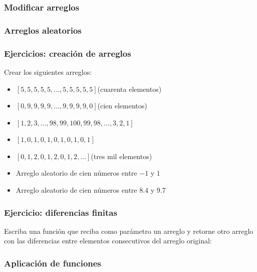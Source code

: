 \documentclass[12pt]{beamer}
\begin{document}
  \begin{frame}
    \label{modificar-arreglos}
    \frametitle{Modificar arreglos}
    \footnotesize
    
  \end{frame}

  \begin{frame}
    \label{arreglos-aleatorios}
    \frametitle{Arreglos aleatorios}
    \footnotesize
    
  \end{frame}

  \begin{frame}
    \label{ejercicio-crear-arreglos}
    \frametitle{Ejercicios: creación de arreglos}
    Crear los siguientes arreglos:
    \begin{itemize}
      \item \([5, 5, 5, 5, 5, \ldots, 5, 5, 5, 5, 5]\)\quad(cuarenta elementos)
      \item \([0, 9, 9, 9, 9, \ldots, 9, 9, 9, 9, 0]\)\quad(cien elementos)
      \item \([1, 2, 3, \ldots, 98, 99, 100, 99, 98, \ldots, 3, 2, 1]\)
      \item \([1, 0, 1, 0, 1, 0, 1, 0, 1, 0, 1]\)
      \item \([0, 1, 2, 0, 1, 2, 0, 1, 2, \ldots]\)\quad(tres mil elementos)
      \item Arreglo aleatorio de cien números entre \(-1\) y \(1\)
      \item Arreglo aleatorio de cien números entre \(8.4\) y \(9.7\)
    \end{itemize}
  \end{frame}

  \begin{frame}
    \label{ejercicio-diferencias}
    \frametitle{Ejercicio: diferencias finitas}
    Escriba una función
    que reciba como parámetro un arreglo
    y retorne otro arreglo
    con las diferencias entre elementos consecutivos
    del arreglo original:
    
  \end{frame}

  \begin{frame}
    \label{vectorizacion}
    \frametitle{Aplicación de funciones}
    
  \end{frame}
\end{document}

